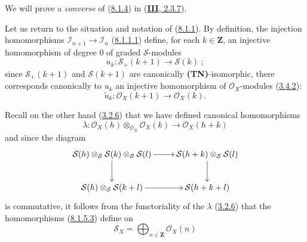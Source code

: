 We will prove a \emph{converse} of
(\hyperref[II.8.1.4]{8.1.4}) in
(\hyperref[III.2.3.7]{\textbf{III}, 2.3.7}).

\begin{env}[8.1.5]
\label{II.8.1.5}
Let us return to the situation and notation of
(\hyperref[II.8.1.1]{8.1.1}). By definition, the injection homomorphisms
$\mathcal{I}_{n+1}\to\mathcal{I}_n$
(\hyperref[II.8.1.1.1]{8.1.1.1}) define, for each $k\in\mathbf{Z}$, an
injective homomorphism of degree $0$ of graded $\mathcal{S}$-modules
\begin{equation}
\label{II.8.1.5.1}
  u_k:\mathcal{S}_+(k+1)\to\mathcal{S}(k)~;
\tag{8.1.5.1}
\end{equation}
since $\mathcal{S}_+(k+1)$ and $\mathcal{S}(k+1)$ are canonically
\textbf{(TN)}-isomorphic, there corresponds canonically to $u_k$ an injective homomorphism
of $\mathcal{O}_X$-modules (\hyperref[II.3.4.2]{3.4.2}):
\begin{equation}
\label{II.8.1.5.2}
  \widetilde{u}_k:\mathcal{O}_X(k+1)\to\mathcal{O}_X(k).
\tag{8.1.5.2}
\end{equation}

Recall on the other hand (\hyperref[II.3.2.6]{3.2.6}) that we have defined
canonical homomorphisms
\begin{equation}
\label{II.8.1.5.3}
  \lambda:\mathcal{O}_X(h)\otimes_{\mathcal{O}_X}\mathcal{O}_X(k)
  \to\mathcal{O}_X(h+k)
\tag{8.1.5.3}
\end{equation}
and since the diagram
\[
\xymatrix{
  \mathcal{S}(h)\otimes_{\mathcal{S}}\mathcal{S}(k)
    \otimes_{\mathcal{S}}\mathcal{S}(l)\ar[r]\ar[d]
  & \mathcal{S}(h+k)\otimes_{\mathcal{S}}\mathcal{S}(l)\ar[d]\\
  \mathcal{S}(h)\otimes_{\mathcal{S}}\mathcal{S}(k+l)\ar[r]
  & \mathcal{S}(h+k+l)
}
\]
is commutative, it follows from the functoriality of the $\lambda$
(\hyperref[II.3.2.6]{3.2.6}) that the homomorphisms
(\hyperref[II.8.1.5.3]{8.1.5.3}) define on
\begin{equation}
\label{II.8.1.5.4}
  \mathcal{S}_X=\bigoplus_{n\in\mathbf{Z}}\mathcal{O}_X(n)
\tag{8.1.5.4}
\end{equation}


\end{env}
